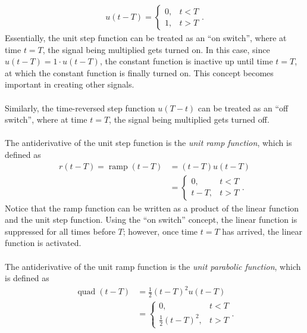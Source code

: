 \documentclass{report}
\begin{document}
\begin{align}
    u(t-T) = 
    \begin{cases} 
        0, & t<T \\
        1, & t>T
    \end{cases}.
\end{align}
Essentially, the unit step function can be treated as an ``on switch'', where at time $t=T$, the signal being multiplied gets turned on. In this case, since $u(t-T)=1\cdot u(t-T)$, 
the constant function is inactive up until time $t=T$, at which the constant function is finally turned on. This concept becomes important in creating other signals. \\ \\
Similarly, the time-reversed step function $u(T-t)$ can be treated as an ``off switch'', where at time $t=T$, the signal being multiplied gets turned off.
\\ \\
The antiderivative of the unit step function is the \emph{unit ramp function}, which is defined as
\begin{align}
    r(t-T) = \operatorname{ramp}(t-T) &= (t-T)u(t-T) \\
    & =
    \begin{cases} 
        0, & t<T \\
        t-T, & t>T
    \end{cases}.
\end{align}
Notice that the ramp function can be written as a product of the linear function and the unit step function. Using the ``on switch'' concept, the linear function is suppressed 
for all times before $T$; however, once time $t=T$ has arrived, the linear function is activated.
\\ \\
The antiderivative of the unit ramp function is the \emph{unit parabolic function}, which is defined as 
\begin{align}
    \operatorname{quad}(t-T) &= \frac{1}{2} (t-T)^2 u(t-T) \\
    &=
    \begin{cases} 
        0, & t<T \\
        \frac{1}{2}(t-T)^2, & t>T
    \end{cases}.
\end{align}
\end{document}
